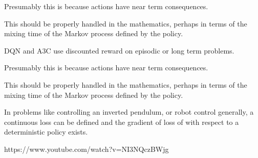 {\vfill
Presumably this is because actions have near term consequences.

\vfill
This should be properly handled in the mathematics, perhaps in terms of the mixing time of
the Markov process defined by the policy.



DQN and A3C use discounted reward on episodic or long term problems.

\vfill
Presumably this is because actions have near term consequences.

\vfill
This should be properly handled in the mathematics, perhaps in terms of the mixing time of
the Markov process defined by the policy.


In problems like controlling an inverted pendulum, or robot control generally,
a continuous loss can be defined and the gradient of loss of with respect to a deterministic policy exists.


https://www.youtube.com/watch?v=NI3NQczBWjg



}



